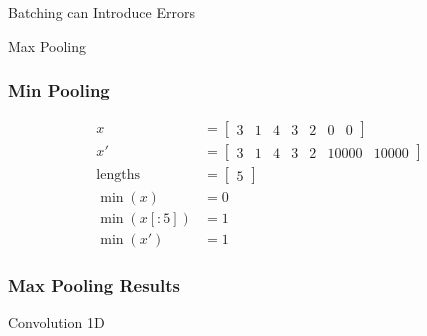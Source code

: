 \documentclass{beamer}
\begin{document}
\begin{section}{Batching can Introduce Errors}
\begin{subsection}{Max Pooling}
        \begin{frame}
            \frametitle{Min Pooling}
            \begin{align*}
                x &= \begin{bmatrix}
                    3 & 1 & 4 & 3 & 2 & 0 & 0
                \end{bmatrix}\\
                x' &= \begin{bmatrix}
                    3 & 1 & 4 & 3 & 2 & 10000 & 10000
                \end{bmatrix}\\
                \text{lengths} &= \begin{bmatrix} 5 \end{bmatrix} \\
                \min(x) &= 0 \\
                \min(x[:5]) &= 1\\
                \min(x') &= 1
            \end{align*}
        \end{frame}

        \begin{frame}
            \frametitle{Max Pooling Results}

        \end{frame}

    \end{subsection} %

    \begin{subsection}{Convolution 1D}


\end{subsection}
\end{section}
\end{document}
